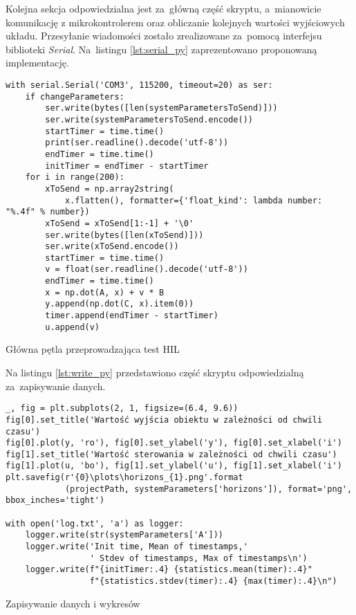Kolejna sekcja odpowiedzialna jest za~główną część skryptu, a~mianowicie komunikację z
mikrokontrolerem oraz obliczanie kolejnych wartości wyjściowych układu. Przesyłanie wiadomości
zostało zrealizowane za~pomocą interfejsu biblioteki \textit{Serial}. Na~listingu \ref{lst:serial_py}
zaprezentowano proponowaną implementację.

\begin{listing}[htb]
\begin{verbatim}
with serial.Serial('COM3', 115200, timeout=20) as ser:
    if changeParameters:
        ser.write(bytes([len(systemParametersToSend)]))
        ser.write(systemParametersToSend.encode())
        startTimer = time.time()
        print(ser.readline().decode('utf-8'))
        endTimer = time.time()
        initTimer = endTimer - startTimer
    for i in range(200):
        xToSend = np.array2string(
            x.flatten(), formatter={'float_kind': lambda number: "%.4f" % number})
        xToSend = xToSend[1:-1] + '\0'
        ser.write(bytes([len(xToSend)]))
        ser.write(xToSend.encode())
        startTimer = time.time()
        v = float(ser.readline().decode('utf-8'))
        endTimer = time.time()
        x = np.dot(A, x) + v * B
        y.append(np.dot(C, x).item(0))
        timer.append(endTimer - startTimer)
        u.append(v)
\end{verbatim}
\caption{Główna pętla przeprowadzająca test HIL}
\label{lst:serial_py}
\end{listing}

Na listingu \ref{lst:write_py} przedstawiono część skryptu odpowiedzialną za~zapisywanie danych.
\begin{listing}[htb]
\begin{verbatim}
_, fig = plt.subplots(2, 1, figsize=(6.4, 9.6))
fig[0].set_title('Wartość wyjścia obiektu w zależności od chwili czasu')
fig[0].plot(y, 'ro'), fig[0].set_ylabel('y'), fig[0].set_xlabel('i')
fig[1].set_title('Wartość sterowania w zależności od chwili czasu')
fig[1].plot(u, 'bo'), fig[1].set_ylabel('u'), fig[1].set_xlabel('i')
plt.savefig(r'{0}\plots\horizons_{1}.png'.format
            (projectPath, systemParameters['horizons']), format='png', bbox_inches='tight')

with open('log.txt', 'a') as logger:
    logger.write(str(systemParameters['A']))
    logger.write('Init time, Mean of timestamps,'
                 ' Stdev of timestamps, Max of timestamps\n')
    logger.write(f"{initTimer:.4} {statistics.mean(timer):.4}"
                 f"{statistics.stdev(timer):.4} {max(timer):.4}\n")
\end{verbatim}
\caption{Zapisywanie danych i wykresów}
\label{lst:write_py}
\end{listing}

